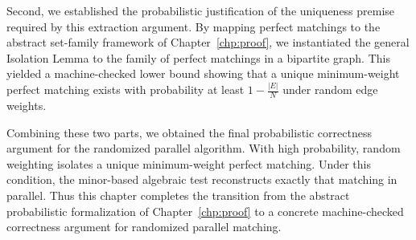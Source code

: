 Second, we established the probabilistic justification of the uniqueness premise required by this extraction argument.
By mapping perfect matchings to the abstract set-family framework of Chapter~\ref{chp:proof}, we instantiated the general Isolation Lemma to the family of perfect matchings in a bipartite graph.
This yielded a machine-checked lower bound showing that a unique minimum-weight perfect matching exists with probability at least $1 - \frac{|E|}{N}$ under random edge weights.

Combining these two parts, we obtained the final probabilistic correctness argument for the randomized parallel algorithm.
With high probability, random weighting isolates a unique minimum-weight perfect matching.
Under this condition, the minor-based algebraic test reconstructs exactly that matching in parallel.
Thus this chapter completes the transition from the abstract probabilistic formalization of Chapter~\ref{chp:proof} to a concrete machine-checked correctness argument for randomized parallel matching.